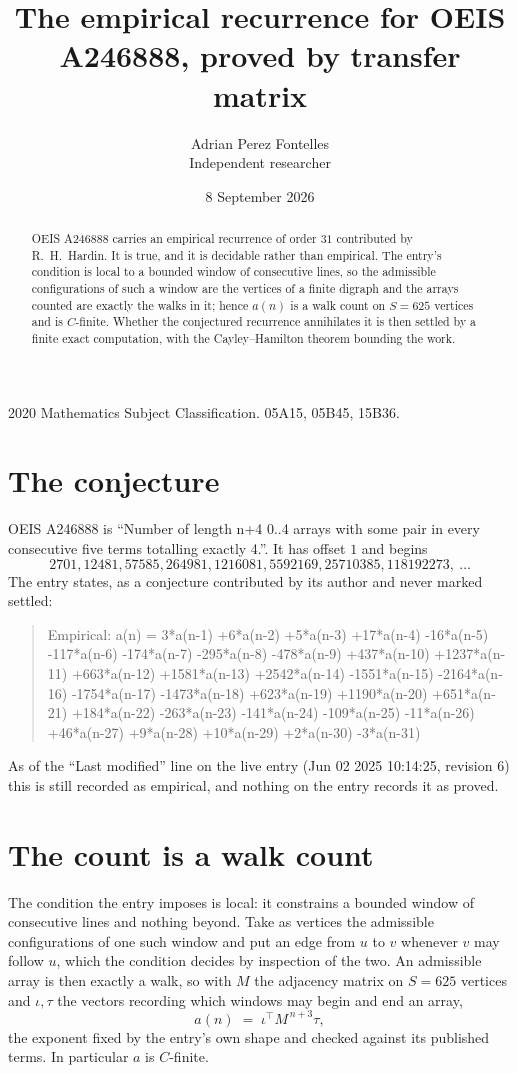 \documentclass[11pt,a4paper]{article}
\title{The empirical recurrence for OEIS A246888, proved by transfer matrix}
\author{Adrian Perez Fontelles\\ \small Independent researcher}
\date{8 September 2026}
\theoremstyle{plain}
\theoremstyle{definition}
\begin{document}
\maketitle

\begin{abstract}
OEIS A246888 carries an empirical recurrence of order $31$ contributed by R.~H.~Hardin. It is
true, and it is decidable rather than empirical. The entry's condition is local to a bounded window of consecutive lines, so
the admissible configurations of such a window are the vertices of a finite digraph and the
arrays counted are exactly the walks in it; hence $a(n)$ is a walk count on $S=625$ vertices
and is $C$-finite. Whether the conjectured recurrence annihilates it is then settled by a
finite exact computation, with the Cayley--Hamilton theorem bounding the work.
\end{abstract}

\noindent\small 2020 Mathematics Subject Classification. 05A15, 05B45, 15B36.\normalsize

\section{The conjecture}

OEIS A246888 is ``Number of length n+4 0..4 arrays with some pair in every consecutive five terms totalling exactly 4.''. It has offset $1$ and begins
\[
2701, 12481, 57585, 264981, 1216081, 5592169, 25710385, 118192273,\ \dots
\]
The entry states, as a conjecture contributed by its author and never marked settled:
\begin{quote}
Empirical: a(n) = 3*a(n-1) +6*a(n-2) +5*a(n-3) +17*a(n-4) -16*a(n-5) -117*a(n-6) -174*a(n-7) -295*a(n-8) -478*a(n-9) +437*a(n-10) +1237*a(n-11) +663*a(n-12) +1581*a(n-13) +2542*a(n-14) -1551*a(n-15) -2164*a(n-16) -1754*a(n-17) -1473*a(n-18) +623*a(n-19) +1190*a(n-20) +651*a(n-21) +184*a(n-22) -263*a(n-23) -141*a(n-24) -109*a(n-25) -11*a(n-26) +46*a(n-27) +9*a(n-28) +10*a(n-29) +2*a(n-30) -3*a(n-31)
\end{quote}
As of the ``Last modified'' line on the live entry (Jun 02 2025 10:14:25, revision 6) this is still
recorded as empirical, and nothing on the entry records it as proved.

\section{The count is a walk count}

The condition the entry imposes is local: it constrains a bounded window of consecutive lines and nothing beyond. Take as
vertices the admissible configurations of one such window and put an edge from $u$ to $v$
whenever $v$ may follow $u$, which the condition decides by inspection of the two. An
admissible array is then exactly a walk, so with $M$ the adjacency matrix on $S=625$ vertices
and $\iota,\tau$ the vectors recording which windows may begin and end an array,
\[
a(n)\;=\;\iota^{\!\top}M^{\,n+3}\tau ,
\]
the exponent fixed by the entry's own shape and checked against its published terms. In
particular $a$ is $C$-finite.
\end{document}
